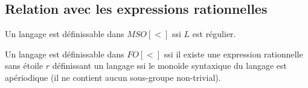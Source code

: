 \subsection{Relation avec les expressions rationnelles}

\begin{theorem}
	Un langage est définissable dans $MSO[<]$ ssi $L$ est régulier.
\end{theorem}


\begin{theorem}
	Un langage est définissable dans $FO[<]$ ssi il existe une expression rationnelle sans étoile $r$ définissant un langage
	ssi
	le monoïde syntaxique du langage est apériodique (\cad il ne contient aucun sous-groupe non-trivial).
\end{theorem}



